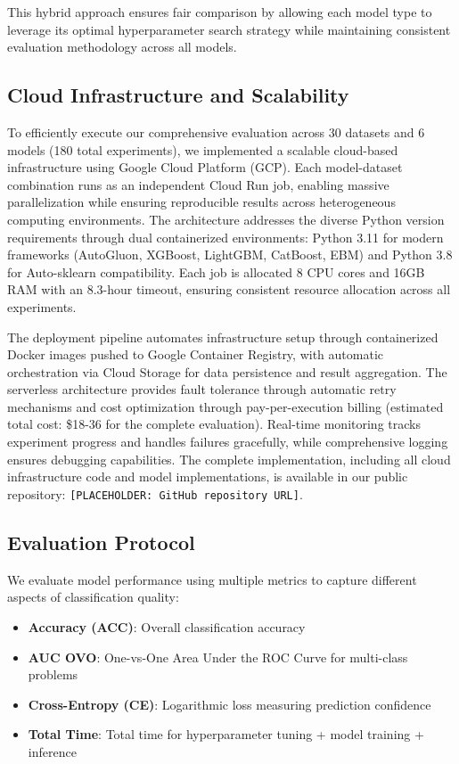 \documentclass[12pt]{article}
\begin{document}
This hybrid approach ensures fair comparison by allowing each model type to leverage its optimal hyperparameter search strategy while maintaining consistent evaluation methodology across all models.

\subsection{Cloud Infrastructure and Scalability}

To efficiently execute our comprehensive evaluation across 30 datasets and 6 models (180 total experiments), we implemented a scalable cloud-based infrastructure using Google Cloud Platform (GCP). Each model-dataset combination runs as an independent Cloud Run job, enabling massive parallelization while ensuring reproducible results across heterogeneous computing environments. The architecture addresses the diverse Python version requirements through dual containerized environments: Python 3.11 for modern frameworks (AutoGluon, XGBoost, LightGBM, CatBoost, EBM) and Python 3.8 for Auto-sklearn compatibility. Each job is allocated 8 CPU cores and 16GB RAM with an 8.3-hour timeout, ensuring consistent resource allocation across all experiments.

The deployment pipeline automates infrastructure setup through containerized Docker images pushed to Google Container Registry, with automatic orchestration via Cloud Storage for data persistence and result aggregation. The serverless architecture provides fault tolerance through automatic retry mechanisms and cost optimization through pay-per-execution billing (estimated total cost: \$18-36 for the complete evaluation). Real-time monitoring tracks experiment progress and handles failures gracefully, while comprehensive logging ensures debugging capabilities. The complete implementation, including all cloud infrastructure code and model implementations, is available in our public repository: \texttt{[PLACEHOLDER: GitHub repository URL]}.

\subsection{Evaluation Protocol}

We evaluate model performance using multiple metrics to capture different aspects of classification quality:

\begin{itemize}
\item \textbf{Accuracy (ACC)}: Overall classification accuracy
\item \textbf{AUC OVO}: One-vs-One Area Under the ROC Curve for multi-class problems
\item \textbf{Cross-Entropy (CE)}: Logarithmic loss measuring prediction confidence
\item \textbf{Total Time}: Total time for hyperparameter tuning + model training + inference
\end{itemize}
\end{document}
